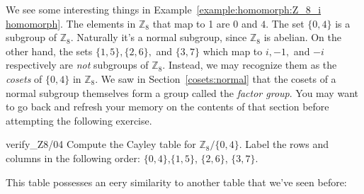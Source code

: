 We see some interesting things in  Example~\ref{example:homomorph:Z_8_i homomorph}. 
The elements in ${\mathbb Z}_8$ that map to 1 are  $0$ and $4$. The set $\{0,4\}$ is a subgroup of ${\mathbb Z}_8$.  Naturally it's a normal subgroup, since $\mathbb{Z}_8$ is abelian.
On the other hand, the sets $\{1,5\}, \{2,6\},$ and $\{3,7\}$ which map to $i, -1,$ and $-i$ respectively are \emph{not} subgroups of ${\mathbb Z}_8$. Instead, we may recognize them as the \emph{cosets} of $\{0,4\}$ in ${\mathbb Z}_8$. We saw in Section~\ref{cosets:normal} 
that the cosets of a normal subgroup themselves form a group called the \emph{factor group}. You may want
to go back and refresh your memory on the contents of that section before attempting the following exercise. 

%

\begin{exercise}{verify_Z8/04}
Compute the Cayley table for ${\mathbb Z}_8/ \{0,4\}$. Label the rows and columns in the following order:
$\{0,4\}$,$\{1,5\}$, $\{2,6\}$,  $\{3,7\}$. 
\end{exercise}

This table possesses an eery similarity to another table that we've seen before:
%
%

